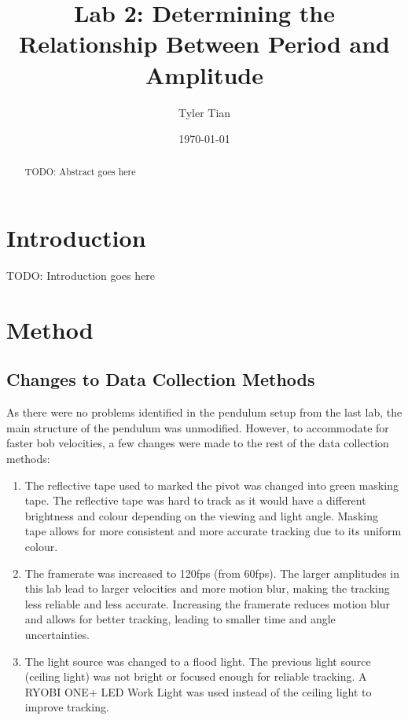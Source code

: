\documentclass[aps,twocolumn,secnumarabic,nobalancelastpage,amsmath,amssymb,nofootinbib]{revtex4}
\begin{document}
\title{Lab 2: Determining the Relationship Between Period and Amplitude}
\author{Tyler Tian}
\date{\today}


\begin{abstract}
TODO: Abstract goes here
\end{abstract}

\maketitle


\section{Introduction}

TODO: Introduction goes here


\section{Method}

\subsection{Changes to Data Collection Methods}

As there were no problems identified in the pendulum setup from the last lab, the main structure of the pendulum was
unmodified. However, to accommodate for faster bob velocities, a few changes were made to the rest of the data
collection methods:

\begin{enumerate}
    \item The reflective tape used to marked the pivot was changed into green masking tape. The reflective tape was
          hard to track as it would have a different brightness and colour depending on the viewing and light angle.
          Masking tape allows for more consistent and more accurate tracking due to its uniform colour.
    \item The framerate was increased to 120fps (from 60fps). The larger amplitudes in this lab lead to larger
          velocities and more motion blur, making the tracking less reliable and less accurate. Increasing the framerate
          reduces motion blur and allows for better tracking, leading to smaller time and angle uncertainties.
    \item The light source was changed to a flood light. The previous light source (ceiling light) was not bright or
          focused enough for reliable tracking. A RYOBI ONE+ LED Work Light was used instead of the ceiling light to
          improve tracking.
\end{enumerate}
\end{document}

